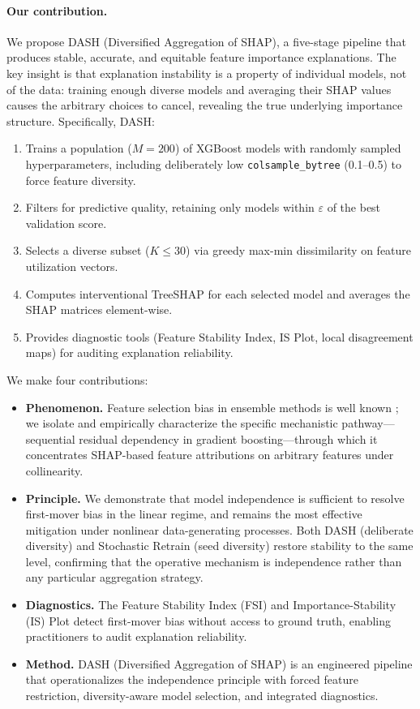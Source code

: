 \documentclass[11pt]{article}
\newcommand{\dash}{\textsc{DASH}}
\begin{document}
\paragraph{Our contribution.}
We propose \dash{} (Diversified Aggregation of SHAP), a five-stage
pipeline that produces stable, accurate, and equitable feature importance
explanations. The key insight is that explanation instability is a property
of individual models, not of the data: training enough diverse models and
averaging their SHAP values causes the arbitrary choices to cancel,
revealing the true underlying importance structure. Specifically, \dash{}:

\begin{enumerate}
  \item Trains a population ($M = 200$) of XGBoost models with
    randomly sampled hyperparameters, including deliberately low
    \texttt{colsample\_bytree} (0.1--0.5) to force feature diversity.
  \item Filters for predictive quality, retaining only models within
    $\varepsilon$ of the best validation score.
  \item Selects a diverse subset ($K \leq 30$) via greedy max-min
    dissimilarity on feature utilization vectors.
  \item Computes interventional TreeSHAP for each selected model and
    averages the SHAP matrices element-wise.
  \item Provides diagnostic tools (Feature Stability Index, IS Plot,
    local disagreement maps) for auditing explanation reliability.
\end{enumerate}

We make four contributions:
\begin{itemize}
  \item \textbf{Phenomenon.} Feature selection bias in ensemble methods
    is well known \citep{strobl2007bias, hooker2019please}; we isolate
    and empirically characterize the specific mechanistic
    pathway---sequential residual dependency in gradient
    boosting---through which it concentrates SHAP-based feature
    attributions on arbitrary features under collinearity.
  \item \textbf{Principle.} We demonstrate that model independence is
    sufficient to resolve first-mover bias in the linear regime, and
    remains the most effective mitigation under nonlinear
    data-generating processes.  Both \dash{} (deliberate diversity) and
    Stochastic Retrain (seed diversity) restore stability to the same
    level, confirming that the operative mechanism is independence
    rather than any particular aggregation strategy.
  \item \textbf{Diagnostics.} The Feature Stability Index (FSI) and
    Importance-Stability (IS) Plot detect first-mover bias without
    access to ground truth, enabling practitioners to audit explanation
    reliability.
  \item \textbf{Method.} \dash{} (Diversified Aggregation of SHAP) is
    an engineered pipeline that operationalizes the independence principle
    with forced feature restriction, diversity-aware model selection,
    and integrated diagnostics.
\end{itemize}
\end{document}
